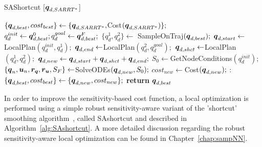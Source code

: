 \begin{algorithm}[h]
    \caption{SAShortcut [$\boldsymbol{q}_{d,SARRT^*}$]}\label{alg:SAshortcut}
    \begin{algorithmic}[1]
        \State $\{\boldsymbol{q}_{d,best}, cost_{best}\} \gets \{\boldsymbol{q}_{d,SARRT^*}, $Cost$(\boldsymbol{q}_{d,SARRT^*}) \};$
        \State $q_d^{init} \gets \boldsymbol{q}_{d,best}^0; q_d^{goal} \gets \boldsymbol{q}_{d,best}^F;$
            \State $\{q_d^{1}, q_d^{2}\} \gets$ SampleOnTraj$(\boldsymbol{q}_{d,best});$
            \State $\boldsymbol{q}_{d,start} \gets $LocalPlan$(q_d^{init}, q_d^{1});$
            \State $\boldsymbol{q}_{d,end} \gets $LocalPlan$(q_d^{2}, q_d^{goal});$
            \State $\boldsymbol{q}_{d,shct} \gets $LocalPlan$(q_d^{1}, q_d^{2});$
                \State $\boldsymbol{q}_{d,new} \gets \boldsymbol{q}_{d,start}+\boldsymbol{q}_{d,shct}+\boldsymbol{q}_{d,end};$
                \State $S_0 \gets $GetNodeConditions$(q_d^{init});$
                \State $\{\boldsymbol{q}_n, \boldsymbol{u}_n, \boldsymbol{r_q}, \boldsymbol{r_u}, S_F\}  \gets $SolveODEs$(\boldsymbol{q}_{d,new}, S_0);$
                \State $cost_{new} \gets $Cost$(\boldsymbol{q}_{d,new});$
                :   
                        \State $\{\boldsymbol{q}_{d,best}, cost_{best}\} \gets \{\boldsymbol{q}_{d,new}, cost_{new}\};$
                    \EndIf
                \EndIf
            \EndIf
        \EndWhile
    \State \textbf{return} $\boldsymbol{q}_{d,best}$
    \end{algorithmic}
\end{algorithm}

In order to improve the sensitivity-based cost function, a local optimization is performed using a simple robust sensitivity-aware variant of the 'shortcut' smoothing algorithm~\cite{cShortcut}, called \gls{SAshortcut} and described in Algorithm~\ref{alg:SAshortcut}. 
A more detailed discussion regarding the robust sensitivity-aware local optimization can be found in Chapter~\ref{chap:sampNN}.

